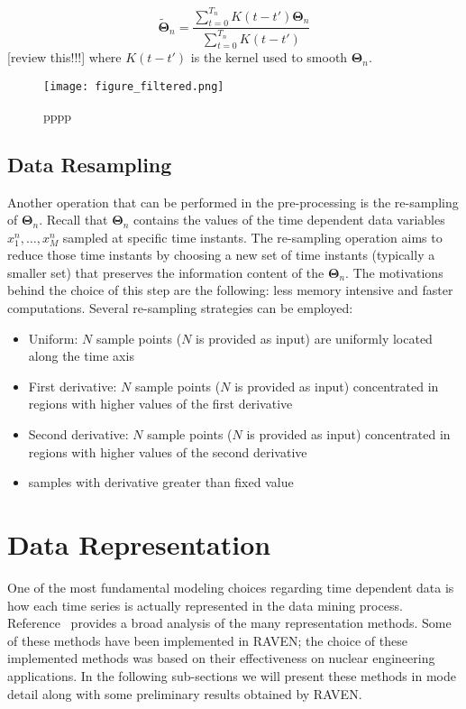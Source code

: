 \begin{equation}
  \bm{\tilde{\Theta}}_n = \dfrac{\sum_{t=0}^{T_n} K(t-t') \bm{\Theta}_n}{\sum_{t=0}^{T_n} K(t-t')} 
  \label{eq:smoothing}
\end{equation}
[review this!!!]
where $K(t-t')$ is the kernel used to smooth $\bm{\Theta}_n$.

\begin{figure}
    \centering
    \centerline{\texttt{[image: figure\_filtered.png]}}
    \caption{pppp}
    \label{fig:smoothing}
\end{figure}

\subsection{Data Resampling}
\label{sec:dataResampling} 

Another operation that can be performed in the pre-processing is the re-sampling of $\bm{\Theta}_n$. Recall that 
$\bm{\Theta}_n$ contains the values of the time dependent data variables ${x_1^n,\ldots,x_M^n}$ sampled at specific 
time instants. 
The re-sampling operation aims to reduce those time instants by choosing a new set of time instants (typically a 
smaller set) that preserves the information content of the $\bm{\Theta}_n$.
The motivations behind the choice of this step are the following: less memory intensive and faster computations.
Several re-sampling strategies can be employed:
\begin{itemize}
  \item Uniform: $N$ sample points ($N$ is provided as input) are uniformly located along the time axis
  \item First derivative: $N$ sample points ($N$ is provided as input) concentrated in regions with higher values 
        of the first derivative
  \item Second derivative: $N$ sample points ($N$ is provided as input) concentrated in regions with higher values 
        of the second derivative
  \item samples with derivative greater than fixed value
\end{itemize}
  
\section{Data Representation}
\label{sec:dataRepresentation}   
  
One of the most fundamental modeling choices regarding time dependent data is how each time series is actually 
represented in the data mining process. Reference~\cite{} provides a broad analysis of the
many representation methods. Some of these methods have been implemented in RAVEN; the choice of these implemented methods 
was based on their effectiveness on nuclear engineering applications. In the following sub-sections we will present 
these methods in mode detail along with some preliminary results obtained by RAVEN. 

